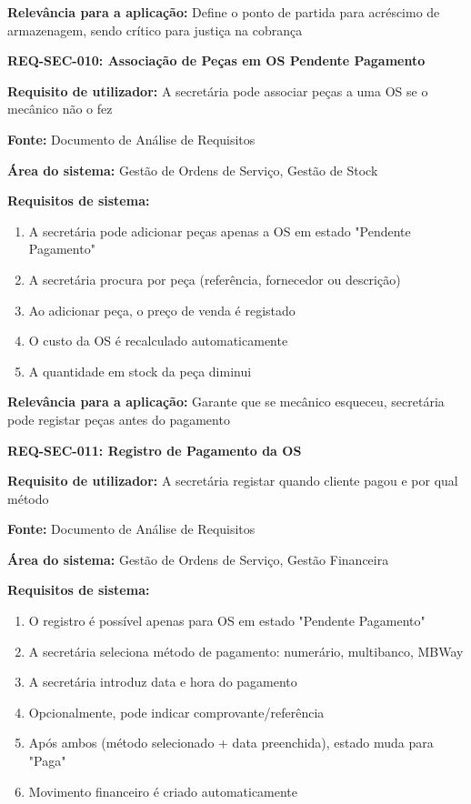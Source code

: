 \documentclass[11pt,a4paper]{article}
\newcommand{\reqheader}[1]{{\noindent\large\bfseries\color{sectionblue}#1}\par\vspace{0.3cm}}
\newcommand{\reqfield}[2]{{\noindent\textbf{#1:} #2}\par\vspace{0.2cm}}
\begin{document}
\reqfield{Relevância para a aplicação}{Define o ponto de partida para acréscimo de armazenagem, sendo crítico para justiça na cobrança}

\vspace{0.8cm}

\reqheader{REQ-SEC-010: Associação de Peças em OS Pendente Pagamento}

\reqfield{Requisito de utilizador}{A secretária pode associar peças a uma OS se o mecânico não o fez}

\reqfield{Fonte}{Documento de Análise de Requisitos}

\reqfield{Área do sistema}{Gestão de Ordens de Serviço, Gestão de Stock}

\reqfield{Requisitos de sistema}{
	\begin{enumerate}
		\item A secretária pode adicionar peças apenas a OS em estado "Pendente Pagamento"
		\item A secretária procura por peça (referência, fornecedor ou descrição)
		\item Ao adicionar peça, o preço de venda é registado
		\item O custo da OS é recalculado automaticamente
		\item A quantidade em stock da peça diminui
	\end{enumerate}
}

\reqfield{Relevância para a aplicação}{Garante que se mecânico esqueceu, secretária pode registar peças antes do pagamento}

\vspace{0.8cm}

\reqheader{REQ-SEC-011: Registro de Pagamento da OS}

\reqfield{Requisito de utilizador}{A secretária registar quando cliente pagou e por qual método}

\reqfield{Fonte}{Documento de Análise de Requisitos}

\reqfield{Área do sistema}{Gestão de Ordens de Serviço, Gestão Financeira}

\reqfield{Requisitos de sistema}{
	\begin{enumerate}
		\item O registro é possível apenas para OS em estado "Pendente Pagamento"
		\item A secretária seleciona método de pagamento: numerário, multibanco, MBWay
		\item A secretária introduz data e hora do pagamento
		\item Opcionalmente, pode indicar comprovante/referência
		\item Após ambos (método selecionado + data preenchida), estado muda para "Paga"
		\item Movimento financeiro é criado automaticamente
	\end{enumerate}
}
\end{document}
